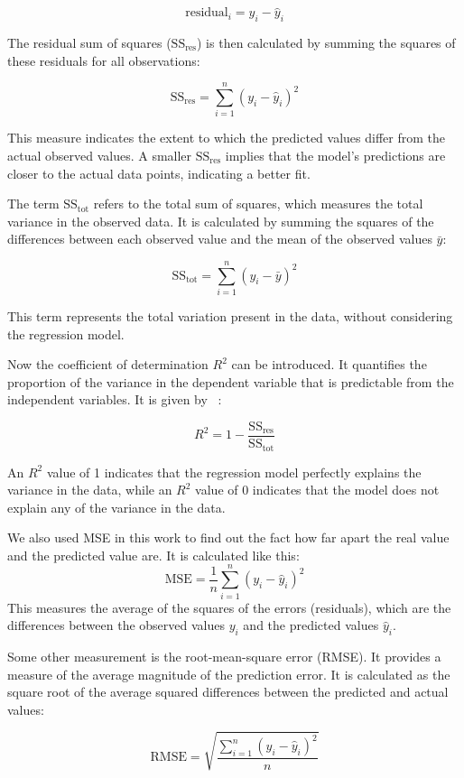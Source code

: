 \[
\text{residual}_i = y_i - \hat{y}_i
\]

The residual sum of squares (\( \text{SS}_{\text{res}} \)) is then calculated by summing the squares of these residuals for all observations:

\[
\text{SS}_{\text{res}} = \sum_{i=1}^{n} (y_i - \hat{y}_i)^2
\]

This measure indicates the extent to which the predicted values differ from the actual observed values. A smaller \( \text{SS}_{\text{res}} \) implies that the model's predictions are closer to the actual data points, indicating a better fit.

The term \(\text{SS}_{\text{tot}}\) refers to the total sum of squares, which measures the total variance in the observed data. It is calculated by summing the squares of the differences between each observed value and the mean of the observed values \(\bar{y}\):

\[
\text{SS}_{\text{tot}} = \sum_{i=1}^{n} (y_i - \bar{y})^2
\]

This term represents the total variation present in the data, without considering the regression model.

Now the coefficient of determination \( R^2 \) can be introduced. It quantifies the proportion of the variance in the dependent variable that is predictable from the independent variables. It is given by ~\cite{Weisberg}:

\[
R^2 = 1 - \frac{\text{SS}_{\text{res}}}{\text{SS}_{\text{tot}}}
\]

An \( R^2 \) value of 1 indicates that the regression model perfectly explains the variance in the data, while an \( R^2 \) value of 0 indicates that the model does not explain any of the variance in the data.

We also used MSE in this work to find out the fact how far apart the real value and the predicted value are. It is calculated like this:
\[
\text{MSE} = \frac{1}{n} \sum_{i=1}^{n} (y_i - \hat{y}_i)^2
\]
This measures the average of the squares of the errors (residuals), which are the differences between the observed values \(y_i\) and the predicted values \(\hat{y}_i\).

Some other measurement is the root-mean-square error (RMSE). It provides a measure of the average magnitude of the prediction error. It is calculated as the square root of the average squared differences between the predicted and actual values:

\[
\text{RMSE} = \sqrt{\frac{\sum_{i=1}^n (y_i - \hat{y}_i)^2}{n}}
\]

